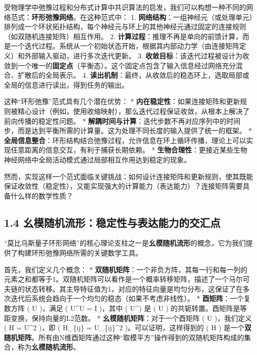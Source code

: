 \documentclass[
  12pt,
]{article}
\begin{document}
受物理学中弛豫过程和分布式计算中共识算法的启发，我们可以构想一种不同的网络范式：\textbf{环形弛豫网络}。在这种范式中：
1.
\textbf{网络结构}：一组神经元（或处理单元）排列成一个环状拓扑结构，每个神经元与环上的其他神经元通过固定的连接规则（如双随机连接矩阵）相互作用。
2.
\textbf{计算过程}：推理不再是单向的前馈计算，而是一个迭代过程。系统从一个初始状态开始，根据其内部动力学（由连接矩阵定义）和外部输入驱动，进行多次迭代更新。
3.
\textbf{收敛目标}：该迭代过程被设计为收敛到一个唯一的\textbf{固定点}（平衡态）。这个固定点包含了输入信息经过网络充分混合、扩散后的全局表示。
4.
\textbf{读出机制}：最终，从收敛后的稳态环上，选取局部或全局的信息进行读出，得到任务的输出。

这种``环形弛豫''范式具有几个潜在优势： *
\textbf{内在稳定性}：如果连接矩阵和更新规则被精心设计（例如，使用收缩映射），那么迭代过程保证收敛，从根本上解决了前向传播的稳定性问题。
*
\textbf{解耦时间与计算}：迭代步数不再对应序列中的时间步，而是达到平衡所需的计算量。这为处理不同长度的输入提供了统一的框架。
*
\textbf{全局信息整合}：环形结构结合弛豫过程，允许信息在环上循环传播，理论上可以实现任意距离的信息交互，有利于捕获长期依赖。
*
\textbf{生物合理性}：更接近某些生物神经网络中全局活动模式通过局部相互作用达到稳定的现象。

然而，实现这样一个范式面临关键挑战：如何设计连接矩阵和更新规则，使其既能保证收敛性（稳定性），又能实现强大的计算能力（表达能力）？连接矩阵需要具备什么样的数学性质？

\hypertarget{ux5e7aux6a21ux968fux673aux6d41ux5f62ux7a33ux5b9aux6027ux4e0eux8868ux8fbeux80fdux529bux7684ux4ea4ux6c47ux70b9}{%
\subsection{1.4
幺模随机流形：稳定性与表达能力的交汇点}\label{ux5e7aux6a21ux968fux673aux6d41ux5f62ux7a33ux5b9aux6027ux4e0eux8868ux8fbeux80fdux529bux7684ux4ea4ux6c47ux70b9}}

``莫比乌斯量子环形网络''的核心理论支柱之一是\textbf{幺模随机流形}的概念，它为我们提供了构建环形弛豫网络所需的关键数学工具。

首先，我们定义几个概念： *
\textbf{双随机矩阵}：一个非负方阵，其每一行和每一列的元素之和都等于1。双随机矩阵可以看作是一个概率转移矩阵，描述了一个马尔可夫链的状态转移。其主导特征值为1，对应的特征向量是均匀分布，这保证了在多次迭代后系统会趋向于一个均匀的稳态（如果不考虑非线性）。
* \textbf{酉矩阵}：一个复数方阵 ( U )，满足 ( U\^{}\dagger U = I )，其中
( U\^{}\dagger ) 是 ( U )
的共轭转置。酉矩阵是等距变换，保持向量的L2范数。 *
\textbf{幺模随机矩阵}：对于一个酉矩阵 ( U )，我们定义 ( H =
\textbar U\textbar\^{}2 )，即 ( H\_\{ij\} =
\textbar U\_\{ij\}\textbar\^{}2 )。可以证明，这样得到的 ( H )
是一个\textbf{双随机矩阵}。所有由N维酉矩阵通过这种``取模平方''操作得到的双随机矩阵构成的集合，称为\textbf{幺模随机流形}。
\end{document}
